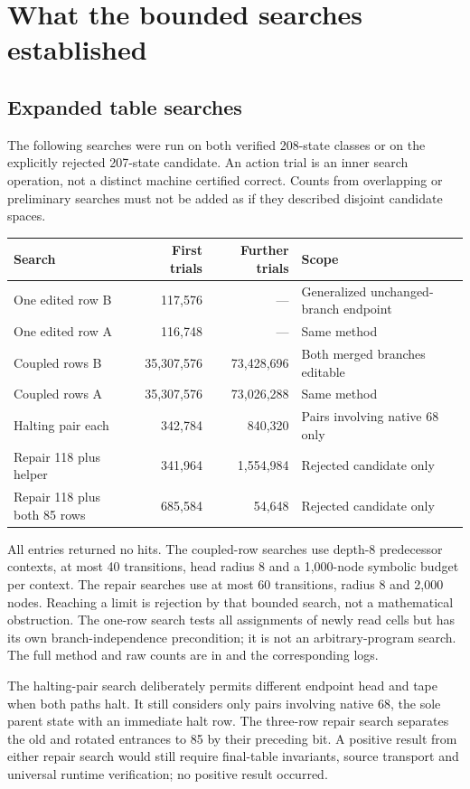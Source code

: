 \documentclass[11pt,letterpaper]{article}
\begin{document}
\section{What the bounded searches established}
\subsection{Expanded table searches}
The following searches were run on both verified 208-state classes or on the
explicitly rejected 207-state candidate. An action trial is an inner search
operation, not a distinct machine certified correct. Counts from overlapping
or preliminary searches must not be added as if they described disjoint
candidate spaces.

\begin{center}\small
\begin{tabularx}{\textwidth}{@{}lrrX@{}}\toprule
Search & First trials & Further trials & Scope\\\midrule
One edited row B & 117,576 & --- & Generalized unchanged-branch endpoint\\
One edited row A & 116,748 & --- & Same method\\
Coupled rows B & 35,307,576 & 73,428,696 & Both merged branches editable\\
Coupled rows A & 35,307,576 & 73,026,288 & Same method\\
Halting pair each & 342,784 & 840,320 & Pairs involving native 68 only\\
Repair 118 plus helper & 341,964 & 1,554,984 & Rejected candidate only\\
Repair 118 plus both 85 rows & 685,584 & 54,648 & Rejected candidate only\\\bottomrule
\end{tabularx}
\end{center}
All entries returned no hits. The coupled-row searches use depth-8 predecessor
contexts, at most 40 transitions, head radius 8 and a 1,000-node symbolic
budget per context. The repair searches use at most 60 transitions, radius 8
and 2,000 nodes. Reaching a limit is rejection by that bounded search, not a
mathematical obstruction. The one-row search tests all assignments of newly
read cells but has its own branch-independence precondition; it is not an
arbitrary-program search. The full method and raw counts are in
 and the corresponding logs.

The halting-pair search deliberately permits different endpoint head and tape
when both paths halt. It still considers only pairs involving native 68,
the sole parent state with an immediate halt row. The three-row repair search
separates the old and rotated entrances to 85 by their preceding bit. A positive
result from either repair search would still require final-table invariants,
source transport and universal runtime verification; no positive result occurred.
\end{document}
